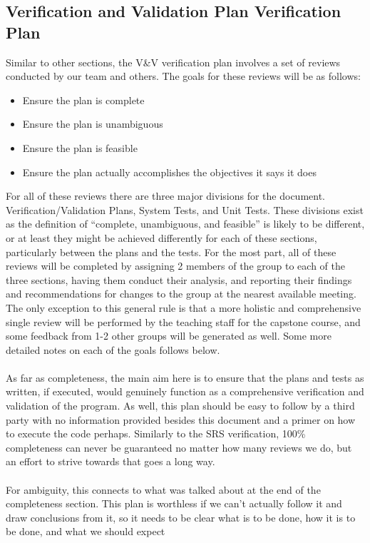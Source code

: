 \documentclass[12pt, titlepage]{article}
\begin{document}
\subsection{Verification and Validation Plan Verification Plan}
Similar to other sections, the V\&V verification plan involves a set of reviews conducted by our team and others. The goals for these reviews will be as follows:
\begin{itemize}
\item Ensure the plan is complete
\item	Ensure the plan is unambiguous
\item	Ensure the plan is feasible
\item	Ensure the plan actually accomplishes the objectives it says it does
\end{itemize} 
For all of these reviews there are three major divisions for the document. Verification/Validation Plans, System Tests, and Unit Tests. These divisions exist as the definition
of “complete, unambiguous, and feasible” is likely to be different, or at least they might be achieved differently for each of these sections, particularly between the plans
and the tests. For the most part, all of these reviews will be completed by assigning 2 members of the group to each of the three sections, having them conduct their analysis,
and reporting their findings and recommendations for changes to the group at the nearest available meeting. The only exception to this general rule is that a more holistic 
and comprehensive single review will be performed by the teaching staff for the capstone course, and some feedback from 1-2 other groups will be generated as well. 
Some more detailed notes on each of the goals follows below.\\\\ As far as completeness, the main aim here is to ensure that the plans and tests as written, if executed,
would genuinely function as a comprehensive verification and validation of the program. As well, this plan should be easy to follow by a third party with no information
provided besides this document and a primer on how to execute the code perhaps. Similarly to the SRS verification, 100\% completeness can never be guaranteed no matter how many
reviews we do, but an effort to strive towards that goes a long way.\\\\ For ambiguity, this connects to what was talked about at the end of the completeness section. 
This plan is worthless if we can’t actually follow it and draw conclusions from it, so it needs to be clear what is to be done, how it is to be done, and what we should expect
\end{document}
